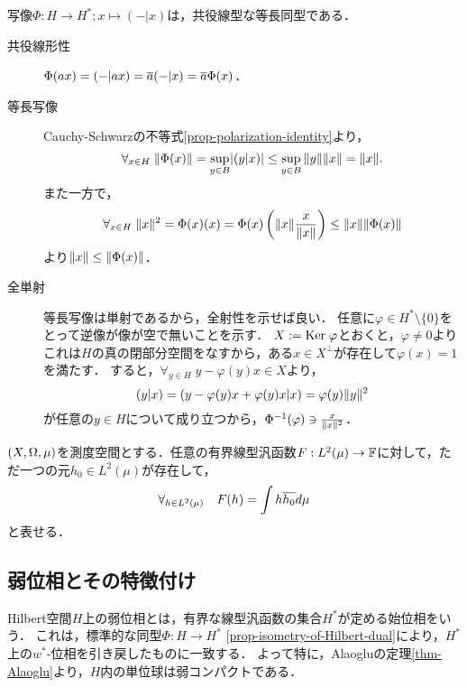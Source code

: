 \documentclass[uplatex,dvipdfmx]{jsreport}
\begin{document}
\begin{proposition}\label{prop-isometry-of-Hilbert-dual}
    写像$\Phi:H\to H^*;x\mapsto(-|x)$は，共役線型な等長同型である．
\end{proposition}
\begin{Proof}\mbox{}
    \begin{description}
        \item[共役線形性] $\Phi(ax)=(-|ax)=\overline{a}(-|x)=\overline{a}\Phi(x)$．
        \item[等長写像] Cauchy-Schwarzの不等式\ref{prop-polarization-identity}より，
        \[\forall_{x\in H}\;\|\Phi(x)\|=\sup_{y\in B}\lvert(y|x)\rvert\le\sup_{y\in B}\|y\|\|x\|=\|x\|.\]
        また一方で，
        \[\forall_{x\in H}\;\|x\|^2=\Phi(x)(x)=\Phi(x)\left(\|x\|\frac{x}{\|x\|}\right)\le\|x\|\|\Phi(x)\|\]
        より$\|x\|\le\|\Phi(x)\|$．
        \item[全単射] 等長写像は単射であるから，全射性を示せば良い．
        任意に$\varphi\in H^*\setminus\{0\}$をとって逆像が像が空で無いことを示す．
        $X:=\mathrm{Ker}\;\varphi$とおくと，$\varphi\ne 0$よりこれは$H$の真の閉部分空間をなすから，ある$x\in X^\perp$が存在して$\varphi(x)=1$を満たす．
        すると，$\forall_{y\in H}\;y-\varphi(y)x\in X$より，
        \[(y|x)=(y-\varphi(y)x+\varphi(y)x|x)=\varphi(y)\|y\|^2\]
        が任意の$y\in H$について成り立つから，$\Phi^{-1}(\varphi)\ni\frac{x}{\|x\|^2}$．
    \end{description}
\end{Proof}

\begin{corollary}[$L^2$上の有界線形関数の積分表現]
    $(X,\Omega,\mu)$を測度空間とする．任意の有界線型汎函数$F:L^2(\mu)\to\mathbb{F}$に対して，ただ一つの元$h_0\in L^2(\mu)$が存在して，
    \[\forall_{h\in L^2(\mu)}\quad F(h)=\int h\overline{h_0}d\mu\]
    と表せる．
\end{corollary}

\subsection{弱位相とその特徴付け}

\begin{definition}\label{def-weak-topology-on-H(B)}
    Hilbert空間$H$上の弱位相とは，有界な線型汎函数の集合$H^*$が定める始位相をいう．
    これは，標準的な同型$\Phi:H\to H^*$ \ref{prop-isometry-of-Hilbert-dual}により，$H^*$上の$w^*$-位相を引き戻したものに一致する．
    よって特に，Alaogluの定理\ref{thm-Alaoglu}より，$H$内の単位球は弱コンパクトである．
\end{definition}
\end{document}
